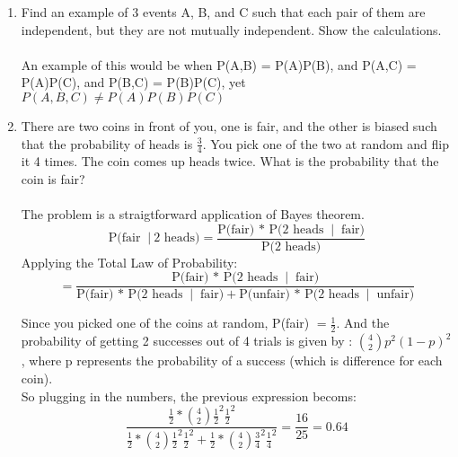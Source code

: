 
\usepackage{amsmath, dsfont}

\oddsidemargin 0in
\evensidemargin 0in
\textwidth 6.5in
\topmargin -0.5in
\textheight 9.0in
\newcommand{\norm}[1]{\left\lVert #1 \right\rVert}
\newcommand{\?}{\stackrel{?}{=}}
\newcommand\given[1][]{\:#1\vert\:}



\pagestyle{myheadings}

\begin{enumerate}
  \item Find an example of 3 events A, B, and C such that each pair of them are independent, but they are not mutually independent. Show the calculations.\\\\
    An example of this would be when P(A,B) = P(A)P(B), and P(A,C) = P(A)P(C), and P(B,C) = P(B)P(C), yet $P(A,B,C) \neq P(A)P(B)P(C)$
    
  \item There are two coins in front of you, one is fair, and the other is biased
such that the probability of heads is $\frac{3}{4}$. You pick one of the two at random and flip it 4 times. The coin comes up heads twice. What is the probability that the coin is fair?\\\\

  The problem is a straigtforward application of Bayes theorem.\\
  $$\text{P(fair } \given \text{2 heads)} = \frac{\text{P(fair) * P(2 heads } \given \text{ fair)}}{\text{P(2 heads)}}$$
  Applying the Total Law of Probability:
  $$= \frac{\text{P(fair) * P(2 heads } \given \text{ fair)}}{\text{P(fair) * P(2 heads } \given \text{ fair)} + \text{P(unfair) * P(2 heads } \given \text{ unfair)}}$$

  Since you picked one of the coins at random, P(fair) $ = \frac{1}{2}$. And the probability of getting 2 successes out of 4 trials is given by : $\binom{4}{2}p^2(1-p)^2$, where p represents the probability of a success (which is difference for each coin).\\

  So plugging in the numbers, the previous expression becoms:
  $$\frac{\frac{1}{2} * \binom{4}{2} \frac{1}{2}^2 \frac{1}{2}^2}{\frac{1}{2} * \binom{4}{2} \frac{1}{2}^2 \frac{1}{2}^2 + \frac{1}{2} * \binom{4}{2} \frac{3}{4}^2 \frac{1}{4}^2} = \frac{16}{25} = 0.64$$

  



\end{enumerate}
